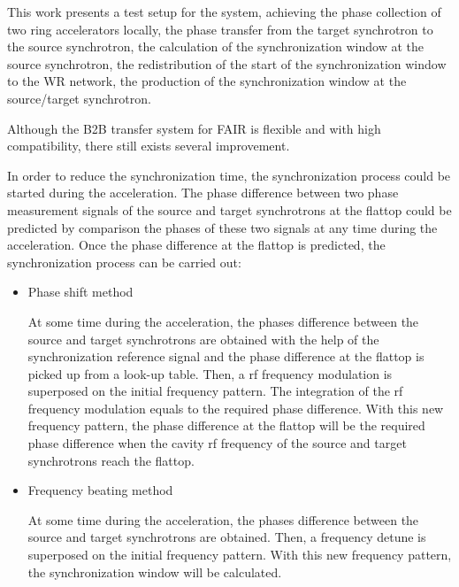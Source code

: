 This work presents a test setup for the system, achieving the phase collection of two ring accelerators locally, the phase transfer from the target synchrotron to the source synchrotron, the calculation of the synchronization window at the source synchrotron, the redistribution of the start of the synchronization window to the WR network, the production of the synchronization window at the source/target synchrotron. 

Although the B2B transfer system for FAIR is flexible and with high compatibility, there still exists several improvement. 

In order to reduce the synchronization time, the synchronization process could be started during the acceleration. The phase difference between two phase measurement signals of the source and target synchrotrons at the flattop could be predicted by comparison the phases of these two signals at any time during the acceleration. Once the phase difference at the flattop is predicted, the synchronization process can be carried out: 
\begin{itemize}
	\item Phase shift method

At some time during the acceleration, the phases difference between the source and target synchrotrons are obtained with the help of the synchronization reference signal and the phase difference at the flattop is picked up from a look-up table. Then, a rf frequency modulation is superposed on the initial frequency pattern. The integration of the rf frequency modulation equals to the required phase difference. With this new frequency pattern, the phase difference at the flattop will be the required phase difference when the cavity rf frequency of the source and target synchrotrons reach the flattop. 
	\item Frequency beating method

At some time during the acceleration, the phases difference between the source and target synchrotrons are obtained. Then, a frequency detune is superposed on the initial frequency pattern. With this new frequency pattern, the synchronization window will be calculated. 
\end{itemize}